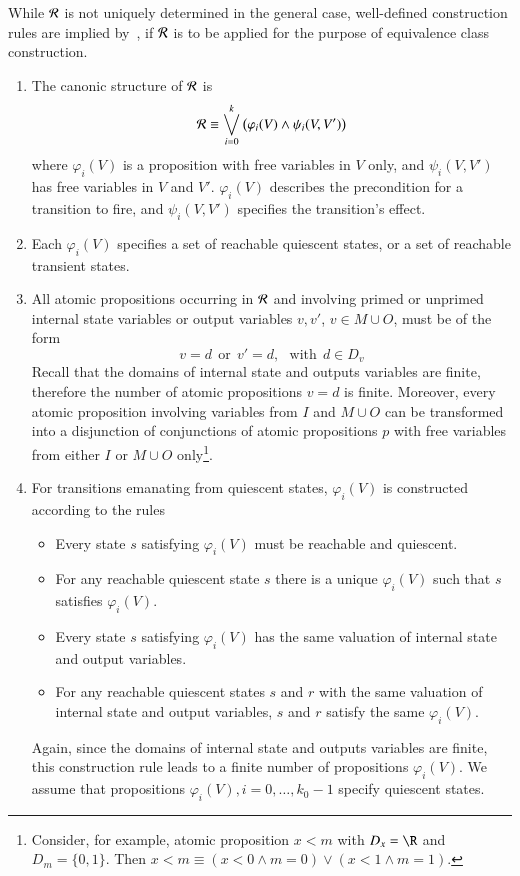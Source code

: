 While    ${\cal R}$ is not uniquely determined in the general case, well-defined construction rules are implied by~\cite{peleska2013ictss}, if ${\cal R}$ is to be applied for the purpose of equivalence class construction.
\begin{enumerate}
\item The canonic structure of ${\cal R}$ is
$$
{\cal R} \equiv  \bigvee_{i=0}^k \big( \varphi_i(V) \wedge \psi_i(V,V') \big)
$$
where $\varphi_i(V)$ is a proposition with free variables  in $V$ only, and $\psi_i(V,V')$ has
free variables in $V$ and $V'$. $\varphi_i(V)$ describes the precondition for a transition to fire, and $\psi_i(V,V')$ specifies the transition's effect.

\item Each $\varphi_i(V)$ specifies a set of reachable quiescent states, or a set of reachable transient states.  

\item All atomic propositions occurring in ${\cal R}$ and involving primed or unprimed internal state variables or output variables $v, v'$, $v\in M\cup O$, must be of the form
$$
     v = d \ \ \text{or}\ \ v' = d, \ \ \  \text{with}\ \ d\in D_v
$$
Recall that the domains of internal state   and outputs variables are finite, therefore the number of atomic propositions $v = d$ is finite. 
Moreover, every atomic proposition involving variables from $I$ and $M\cup O$ can be transformed into a disjunction of conjunctions of atomic propositions $p$ with free variables from either $I$ or  $M\cup O$ only\footnote{Consider, for example, atomic proposition $x < m$ with $D_x = \R$ and $D_m = \{0,1\}$. Then $x < m \equiv (x < 0 \wedge m = 0) \vee (x < 1 \wedge m = 1)$.}.

\item For transitions emanating from   quiescent states, $\varphi_i(V)$ is constructed according to the rules
\begin{itemize}
\item Every state $s$ satisfying $\varphi_i(V)$ must be reachable and quiescent.
\item For any reachable quiescent state $s$ there is a unique $\varphi_i(V)$ such that $s$ satisfies $\varphi_i(V)$.
\item Every state $s$ satisfying $\varphi_i(V)$  has the same valuation of internal state and output variables. 
\item For any reachable quiescent states $s$ and $r$ with the same valuation of internal state and output variables, $s$ and $r$ satisfy the same $\varphi_i(V)$. 
\end{itemize}
Again, since the domains of internal state   and outputs variables are finite, this construction rule leads to a finite number of propositions $\varphi_i(V)$. We assume that propositions
$\varphi_i(V), i = 0,\dots,k_0-1$ specify quiescent states.


\end{enumerate}
